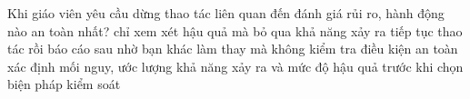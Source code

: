 \begin{ex}
Khi giáo viên yêu cầu dừng thao tác liên quan đến đánh giá rủi ro, hành động nào an toàn nhất?
\choice
{chỉ xem xét hậu quả mà bỏ qua khả năng xảy ra}
{tiếp tục thao tác rồi báo cáo sau}
{nhờ bạn khác làm thay mà không kiểm tra điều kiện an toàn}
{\True xác định mối nguy, ước lượng khả năng xảy ra và mức độ hậu quả trước khi chọn biện pháp kiểm soát}
\end{ex}

